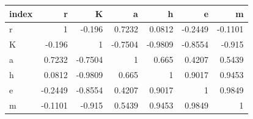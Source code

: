\begin{tabular}{lrrrrrr}
\toprule
index & r & K & a & h & e & m \\
\midrule
r & 1 & -0.196 & 0.7232 & 0.0812 & -0.2449 & -0.1101 \\
K & -0.196 & 1 & -0.7504 & -0.9809 & -0.8554 & -0.915 \\
a & 0.7232 & -0.7504 & 1 & 0.665 & 0.4207 & 0.5439 \\
h & 0.0812 & -0.9809 & 0.665 & 1 & 0.9017 & 0.9453 \\
e & -0.2449 & -0.8554 & 0.4207 & 0.9017 & 1 & 0.9849 \\
m & -0.1101 & -0.915 & 0.5439 & 0.9453 & 0.9849 & 1 \\
\bottomrule
\end{tabular}
